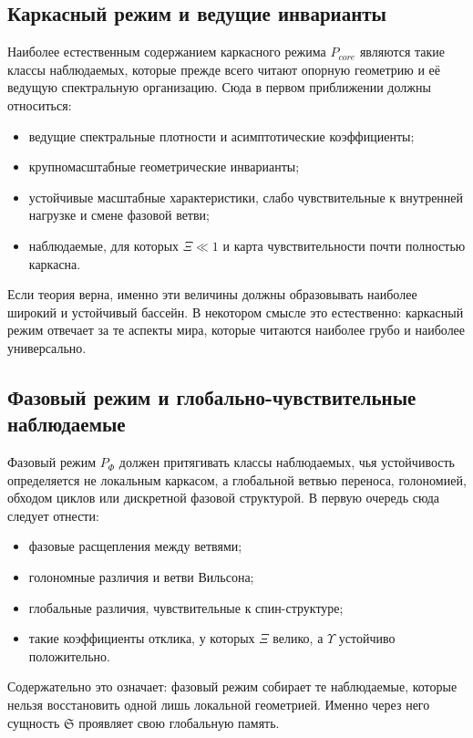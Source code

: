 \documentclass[12pt,a4paper]{article}
\begin{document}
\subsection{Каркасный режим и ведущие инварианты}

Наиболее естественным содержанием каркасного режима \(P_{core}\) являются такие классы наблюдаемых, которые прежде всего читают опорную геометрию и её ведущую спектральную организацию. Сюда в первом приближении должны относиться:
\begin{itemize}
    \item ведущие спектральные плотности и асимптотические коэффициенты;
    \item крупномасштабные геометрические инварианты;
    \item устойчивые масштабные характеристики, слабо чувствительные к внутренней нагрузке и смене фазовой ветви;
    \item наблюдаемые, для которых \(\Xi \ll 1\) и карта чувствительности почти полностью каркасна.
\end{itemize}

Если теория верна, именно эти величины должны образовывать наиболее широкий и устойчивый бассейн. В некотором смысле это естественно: каркасный режим отвечает за те аспекты мира, которые читаются наиболее грубо и наиболее универсально.

\subsection{Фазовый режим и глобально-чувствительные наблюдаемые}

Фазовый режим \(P_{\Phi}\) должен притягивать классы наблюдаемых, чья устойчивость определяется не локальным каркасом, а глобальной ветвью переноса, голономией, обходом циклов или дискретной фазовой структурой. В первую очередь сюда следует отнести:
\begin{itemize}
    \item фазовые расщепления между ветвями;
    \item голономные различия и ветви Вильсона;
    \item глобальные различия, чувствительные к спин-структуре;
    \item такие коэффициенты отклика, у которых \(\Xi\) велико, а \(\Upsilon\) устойчиво положительно.
\end{itemize}

Содержательно это означает: фазовый режим собирает те наблюдаемые, которые нельзя восстановить одной лишь локальной геометрией. Именно через него сущность \(\mathfrak{S}\) проявляет свою глобальную память.
\end{document}
